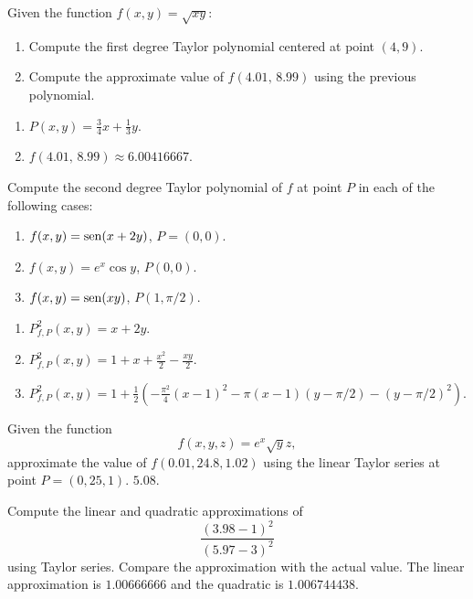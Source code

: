 
{Given the function $f(x,y)=\sqrt{xy}$:
\begin{enumerate}
\item Compute the first degree Taylor polynomial centered at point $(4,9)$.
\item Compute the approximate value of $f(4.01,\,8.99)$ using the previous polynomial.
\end{enumerate}
}
{\begin{enumerate}
\item $P(x,y)= \frac{3}{4}x+\frac{1}{3}y$.
\item $f(4.01,\,8.99)\approx 6.00416667$.
\end{enumerate}
}
{
}


{Compute the second degree Taylor polynomial of $f$ at point $P$ in each of the following cases:
\begin{enumerate}
\item $f(x,y)=\operatorname{sen}(x+2y)$, $P=(0,0)$.
\item $f(x,y)=e^x\cos y$, $P(0,0)$.
\item $f(x,y)=\operatorname{sen}(xy)$, $P(1,\pi/2)$.
\end{enumerate}
}
{\begin{enumerate}
\item $P^2_{f,P}(x,y)= x+2y$.
\item $P^2_{f,P}(x,y)= 1+x+\frac{x^2}{2}-\frac{xy}{2}$.
\item $P^2_{f,P}(x,y)= 1+\frac{1}{2}\left(-\frac{\pi^2}{4}(x-1)^2-\pi(x-1)(y-\pi/2)-(y-\pi/2)^2\right)$.
\end{enumerate}
}
{
}


{Given the function
\[
f(x,y,z)=e^x\sqrt{y}z,
\]
approximate the value of $f(0.01,24.8,1.02)$ using the linear Taylor series at point $P=(0,25,1)$.
}
{$5.08$.
}
{
}


{Compute the linear and quadratic approximations of
\[
\frac{(3.98-1)^2}{(5.97-3)^2}
\]
using Taylor series.
Compare the approximation with the actual value.
}
{The linear approximation is $1.00666666$ and the quadratic is $1.006744438$.
}
{
}
